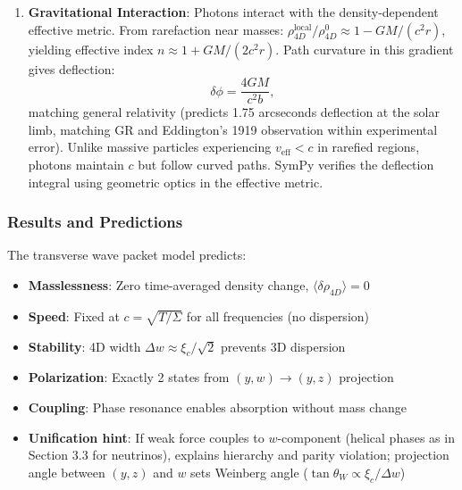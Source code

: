 \begin{enumerate}
\item \textbf{Gravitational Interaction}: Photons interact with the density-dependent effective metric. From rarefaction near masses: $\rho_{4D}^{\text{local}}/\rho_{4D}^0 \approx 1 - GM/(c^2r)$, yielding effective index $n \approx 1 + GM/(2c^2r)$. Path curvature in this gradient gives deflection:
   \[
   \delta\phi = \frac{4GM}{c^2b},
   \]
   matching general relativity (predicts 1.75 arcseconds deflection at the solar limb, matching GR and Eddington's 1919 observation within experimental error). Unlike massive particles experiencing $v_{\text{eff}} < c$ in rarefied regions, photons maintain $c$ but follow curved paths. SymPy verifies the deflection integral using geometric optics in the effective metric.
\end{enumerate}

\subsubsection{Results and Predictions}
The transverse wave packet model predicts:
\begin{itemize}
\item \textbf{Masslessness}: Zero time-averaged density change, $\langle\delta\rho_{4D}\rangle = 0$
\item \textbf{Speed}: Fixed at $c = \sqrt{T/\Sigma}$ for all frequencies (no dispersion)
\item \textbf{Stability}: 4D width $\Delta w \approx \xi_c / \sqrt{2}$ prevents 3D dispersion
\item \textbf{Polarization}: Exactly 2 states from $(y,w) \to (y,z)$ projection
\item \textbf{Coupling}: Phase resonance enables absorption without mass change
\item \textbf{Unification hint}: If weak force couples to $w$-component (helical phases as in Section 3.3 for neutrinos), explains hierarchy and parity violation; projection angle between $(y,z)$ and $w$ sets Weinberg angle ($\tan\theta_W \propto \xi_c/\Delta w$)
\end{itemize}



